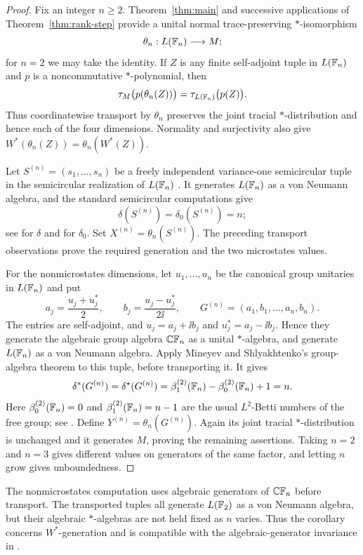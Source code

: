 \begin{proof}
Fix an integer $n\geq2$. Theorem~\ref{thm:main} and successive
applications of Theorem~\ref{thm:rank-step} provide a unital normal
trace-preserving $*$-isomorphism
\[
 \theta_n:L(\mathbb F_n)\longrightarrow M;
\]
for $n=2$ we may take the identity. If $Z$ is any finite self-adjoint tuple in
$L(\mathbb F_n)$ and $p$ is a noncommutative $*$-polynomial, then
\[
 \tau_M\bigl(p(\theta_n(Z))\bigr)=\tau_{L(\mathbb F_n)}\bigl(p(Z)\bigr).
\]
Thus coordinatewise transport by $\theta_n$ preserves the joint
tracial $*$-distribution and hence each of the four dimensions.
Normality and surjectivity also give
$W^*(\theta_n(Z))=\theta_n(W^*(Z))$.

Let $S^{(n)}=(s_1,\ldots,s_n)$ be a freely independent variance-one semicircular
tuple in the semicircular realization of $L(\mathbb F_n)$
\cite[Remarks~1.10--1.11]{voiculescu1990}. It generates $L(\mathbb F_n)$ as a von Neumann algebra,
and the standard semicircular computations give
\[
 \delta(S^{(n)})=\delta_0(S^{(n)})=n;
\]
see \cite[Section~2.4(c) and (d)]{voiculescu2002entropy} for $\delta$
and \cite[Section~5, opening paragraph]{brannan_elzinga_harris_yamashita2023}
for $\delta_0$. Set $X^{(n)}=\theta_n(S^{(n)})$. The preceding
transport observations prove the required generation and the two
microstates values.

For the nonmicrostates dimensions, let $u_1,\ldots,u_n$ be the
canonical group unitaries in $L(\mathbb F_n)$ and put
\[
 a_j=\frac{u_j+u_j^*}{2},\qquad
 b_j=\frac{u_j-u_j^*}{2\ii},\qquad
 G^{(n)}=(a_1,b_1,\ldots,a_n,b_n).
\]
The entries are self-adjoint, and $u_j=a_j+\ii b_j$ and
$u_j^*=a_j-\ii b_j$. Hence they generate the algebraic group algebra
$\mathbb C\mathbb F_n$ as a unital $*$-algebra, and generate $L(\mathbb F_n)$ as a von
Neumann algebra. Apply Mineyev and Shlyakhtenko's group-algebra theorem
\cite[Theorem~4.1]{mineyev_shlyakhtenko2005} to this tuple, before
transporting it. It gives
\[
 \delta^*(G^{(n)})=\delta^\star(G^{(n)})
 =\beta_1^{(2)}(\mathbb F_n)-\beta_0^{(2)}(\mathbb F_n)+1=n.
\]
Here $\beta_0^{(2)}(\mathbb F_n)=0$ and $\beta_1^{(2)}(\mathbb F_n)=n-1$ are the
usual $L^2$-Betti numbers of the free group; see
\cite[Section~2.1.1]{connes_shlyakhtenko2005}. Define
$Y^{(n)}=\theta_n(G^{(n)})$. Again its joint tracial $*$-distribution
is unchanged and it generates $M$, proving the remaining assertions.
Taking $n=2$ and $n=3$ gives different values on generators of the
same factor, and letting $n$ grow gives unboundedness.
\end{proof}

The nonmicrostates computation uses algebraic generators of
$\mathbb C\mathbb F_n$ before transport. The transported tuples all generate
$L(\mathbb F_2)$ as a von Neumann algebra, but their algebraic $*$-algebras
are not held fixed as $n$ varies. Thus the corollary concerns
$W^*$-generation and is compatible with the algebraic-generator
invariance in \cite[Theorem~4.1]{mineyev_shlyakhtenko2005}.
